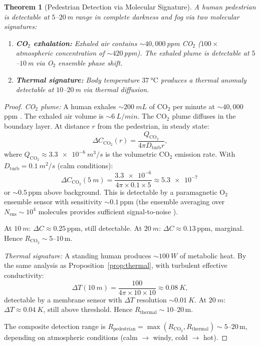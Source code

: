 \documentclass[11pt,twocolumn,a4paper]{article}
\theoremstyle{plain}
\newtheorem{theorem}{Theorem}[section]
\theoremstyle{definition}
\theoremstyle{remark}
\newcommand{\Nens}{N_{\mathrm{ens}}}
\newcommand{\Dturb}{D_{\mathrm{turb}}}
\begin{document}
\begin{theorem}[Pedestrian Detection via Molecular Signature]
\label{thm:pedestrian}
A human pedestrian is detectable at $5$--$20$\,m range in complete darkness and fog via two molecular signatures:
\begin{enumerate}[nosep]
    \item \textbf{CO$_2$ exhalation:} Exhaled air contains $\sim 40{,}000$\,ppm CO$_2$ ($100\times$ atmospheric concentration of $\sim 420$\,ppm). The exhaled plume is detectable at $5$--$10$\,m via O$_2$ ensemble phase shift.
    \item \textbf{Thermal signature:} Body temperature $\SI{37}{\celsius}$ produces a thermal anomaly detectable at $10$--$20$\,m via thermal diffusion.
\end{enumerate}
\end{theorem}

\begin{proof}
\emph{CO$_2$ plume:} A human exhales $\sim \SI{200}{mL}$ of CO$_2$ per minute at $\sim 40{,}000$\,ppm \cite{seinfeld2016atmospheric}. The exhaled air volume is $\sim \SI{6}{L/min}$. The CO$_2$ plume diffuses in the boundary layer. At distance $r$ from the pedestrian, in steady state:
\begin{equation}
\Delta C_{\mathrm{CO}_2}(r) = \frac{Q_{\mathrm{CO}_2}}{4\pi \Dturb r},
\end{equation}
where $Q_{\mathrm{CO}_2} \approx \SI{3.3e-6}{m^3/s}$ is the volumetric CO$_2$ emission rate. With $\Dturb = \SI{0.1}{m^2/s}$ (calm conditions):
\begin{equation}
\Delta C_{\mathrm{CO}_2}(\SI{5}{m}) = \frac{\num{3.3e-6}}{4\pi \times 0.1 \times 5} \approx \SI{5.3e-7}{}
\end{equation}
or $\sim 0.5$\,ppm above background. This is detectable by a paramagnetic O$_2$ ensemble sensor with sensitivity $\sim 0.1$\,ppm (the ensemble averaging over $\Nens \sim 10^4$ molecules provides sufficient signal-to-noise \cite{sachikonye2026gas}).

At $\SI{10}{m}$: $\Delta C \approx 0.25$\,ppm, still detectable. At $\SI{20}{m}$: $\Delta C \approx 0.13$\,ppm, marginal. Hence $R_{\mathrm{CO}_2} \sim 5$--$10$\,m.

\emph{Thermal signature:} A standing human produces $\sim \SI{100}{W}$ of metabolic heat. By the same analysis as Proposition~\ref{prop:thermal}, with turbulent effective conductivity:
\begin{equation}
\Delta T(\SI{10}{m}) = \frac{100}{4\pi \times 10 \times 10} \approx \SI{0.08}{K},
\end{equation}
detectable by a membrane sensor with $\Delta T$ resolution $\sim \SI{0.01}{K}$. At $\SI{20}{m}$: $\Delta T \approx \SI{0.04}{K}$, still above threshold. Hence $R_{\mathrm{thermal}} \sim 10$--$20$\,m.

The composite detection range is $R_{\mathrm{pedestrian}} = \max(R_{\mathrm{CO}_2}, R_{\mathrm{thermal}}) \sim 5$--$20$\,m, depending on atmospheric conditions (calm $\to$ windy, cold $\to$ hot).
\end{proof}
\end{document}

